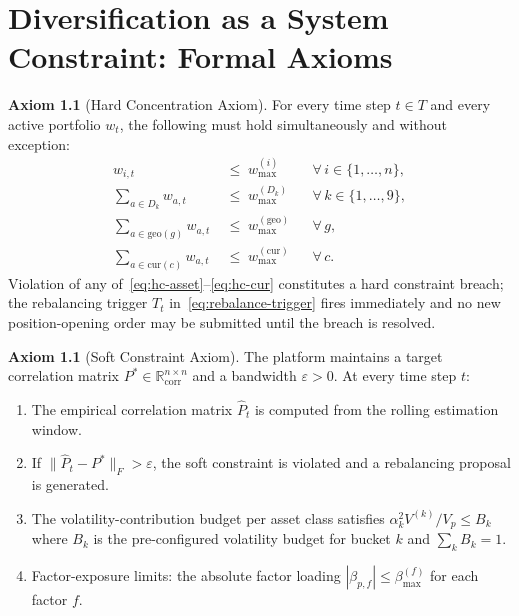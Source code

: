 \documentclass[12pt,openany]{book}
\newcommand{\R}{\mathbb{R}}
\newcommand{\bfw}{\mathbf{w}}
\newcommand{\calD}{\mathcal{D}}
\numberwithin{equation}{chapter}
\theoremstyle{plain}
\theoremstyle{definition}
\newtheorem{axiom}[theorem]{Axiom}
\theoremstyle{remark}
\def\calD{D}%
\def\mathcal#1{#1}%
\def\bfw{w}%
\begin{document}
\chapter{Diversification as a System Constraint: Formal Axioms}
\label{ch:axioms}

\begin{axiom}[Hard Concentration Axiom]
\label{ax:hard-concentration}
For every time step $t \in \mathcal{T}$ and every active portfolio
$\bfw_t$, the following must hold simultaneously and without exception:
\begin{align}
  w_{i,t} &\;\leq\; w_{\max}^{(i)}
    &&\forall\, i \in \{1,\ldots,n\},
    \label{eq:hc-asset} \\
  \sum_{a \in \calD_k} w_{a,t} &\;\leq\; w_{\max}^{(\calD_k)}
    &&\forall\, k \in \{1,\ldots,9\},
    \label{eq:hc-bucket} \\
  \sum_{a \in \mathrm{geo}(g)} w_{a,t}
    &\;\leq\; w_{\max}^{(\mathrm{geo})}
    &&\forall\, g,
    \label{eq:hc-geo} \\
  \sum_{a \in \mathrm{cur}(c)} w_{a,t}
    &\;\leq\; w_{\max}^{(\mathrm{cur})}
    &&\forall\, c.
    \label{eq:hc-cur}
\end{align}
Violation of any of~\eqref{eq:hc-asset}--\eqref{eq:hc-cur}
constitutes a hard constraint breach; the rebalancing trigger
$T_t$ in~\eqref{eq:rebalance-trigger} fires immediately and no
new position-opening order may be submitted until the breach is
resolved.
\end{axiom}

\begin{axiom}[Soft Constraint Axiom]
\label{ax:soft-constraint}
The platform maintains a target correlation matrix $P^* \in
\R^{n \times n}_{\mathrm{corr}}$ and a bandwidth $\varepsilon > 0$.
At every time step $t$:
\begin{enumerate}
  \item The empirical correlation matrix $\hat{P}_t$ is computed
        from the rolling estimation window.
  \item If $\|\hat{P}_t - P^*\|_F > \varepsilon$, the soft
        constraint is violated and a rebalancing proposal is
        generated.
  \item The volatility-contribution budget per asset class satisfies
        $\alpha_k^2 V^{(k)} / V_p \leq B_k$ where $B_k$ is the
        pre-configured volatility budget for bucket $k$ and
        $\sum_k B_k = 1$.
  \item Factor-exposure limits: the absolute factor loading
        $|\beta_{p,f}| \leq \beta_{\max}^{(f)}$ for each factor $f$.
\end{enumerate}
\end{axiom}
\end{document}
